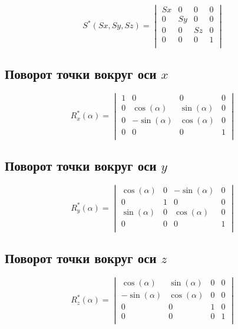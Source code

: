 \documentclass[a4paper]{article}
\theoremstyle{hangindent}
\theoremstyle{hangindent}
\begin{document}
\begin{equation}
    S^*(Sx, Sy, Sz) =
    \begin{vmatrix}
        Sx & 0  & 0  & 0 \\
        0  & Sy & 0  & 0 \\
        0  & 0  & Sz & 0 \\
        0  & 0  & 0  & 1 \\
    \end{vmatrix}
\end{equation}

\subsection{Поворот точки вокруг оси $x$}

\begin{equation}
    R^*_x(\alpha) =
    \begin{vmatrix}
        1 & 0             & 0            & 0 \\
        0 & \cos(\alpha)  & \sin(\alpha) & 0 \\
        0 & -\sin(\alpha) & \cos(\alpha) & 0 \\
        0 & 0             & 0            & 1 \\
    \end{vmatrix}
\end{equation}

\subsection{Поворот точки вокруг оси $y$}

\begin{equation}
    R^*_y(\alpha) =
    \begin{vmatrix}
        \cos(\alpha) & 0 & -\sin(\alpha) & 0 \\
        0            & 1 & 0             & 0 \\
        \sin(\alpha) & 0 & \cos(\alpha)  & 0 \\
        0            & 0 & 0             & 1 \\
    \end{vmatrix}
\end{equation}

\subsection{Поворот точки вокруг оси $z$}

\begin{equation}
    R^*_z(\alpha) =
    \begin{vmatrix}
        \cos(\alpha)  & \sin(\alpha) & 0 & 0 \\
        -\sin(\alpha) & \cos(\alpha) & 0 & 0 \\
        0             & 0            & 1 & 0 \\
        0             & 0            & 0 & 1 \\
    \end{vmatrix}
\end{equation}
\end{document}

